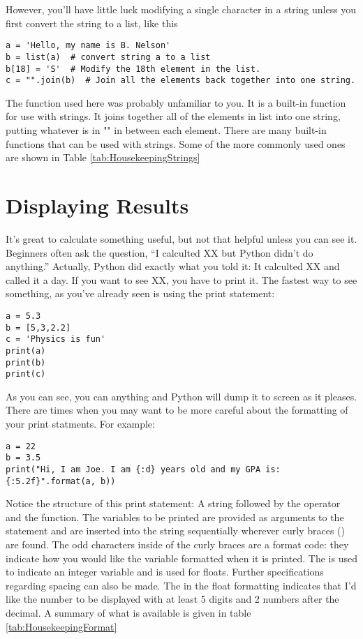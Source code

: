  However, you'll have little luck modifying a single character in a
string unless you first convert the string to a list, like this
\begin{Verbatim}
a = 'Hello, my name is B. Nelson'
b = list(a)  # convert string a to a list
b[18] = 'S'  # Modify the 18th element in the list.
c = "".join(b)  # Join all the elements back together into one string.
\end{Verbatim}
The  function used here was probably unfamiliar to you.
It is a built-in function for use with strings.  It joins together all
of the elements in list  into one string, putting whatever
is in "" in between
each element.  There are many built-in functions that can be used with
strings.  Some of the more commonly used ones are shown in Table \ref{tab:HousekeepingStrings}
\section{Displaying Results}
It's great to calculate something useful, but not that helpful unless
you can see it.  Beginners often ask the question, ``I calculted XX
but Python didn't do anything.''  Actually, Python did exactly what
you told it:  It calculted XX and called it a day.  If you want to see
XX, you have to print it.   The fastest way to see something, as
you've already seen is using the print statement:
\begin{Verbatim}
a = 5.3
b = [5,3,2.2]
c = 'Physics is fun'
print(a)
print(b)
print(c)
\end{Verbatim}
As you can see, you can  anything and Python will dump
it to screen as it pleases.  There are times when you may want to be
more careful about the formatting of your print statments.  For
example:
\begin{Verbatim}
a = 22
b = 3.5
print("Hi, I am Joe. I am {:d} years old and my GPA is: {:5.2f}".format(a, b))
\end{Verbatim}
Notice the structure of this print statement: A string followed by the
 operator and the  function. The variables to
be printed are provided as arguments to the  statement
and are inserted into the string sequentially wherever curly braces
(\code{\{\}}) are found.  The odd characters inside of the curly
braces are a format code: they indicate how you would like the
variable formatted when it is printed. The  is used to
indicate an integer variable and  is used for floats.
Further specifications regarding spacing can also be made.  The
 in the float formatting indicates that I'd like the number
to be displayed with at least 5 digits and 2 numbers after the
decimal.  A summary of what is available is given in table
\ref{tab:HousekeepingFormat}

